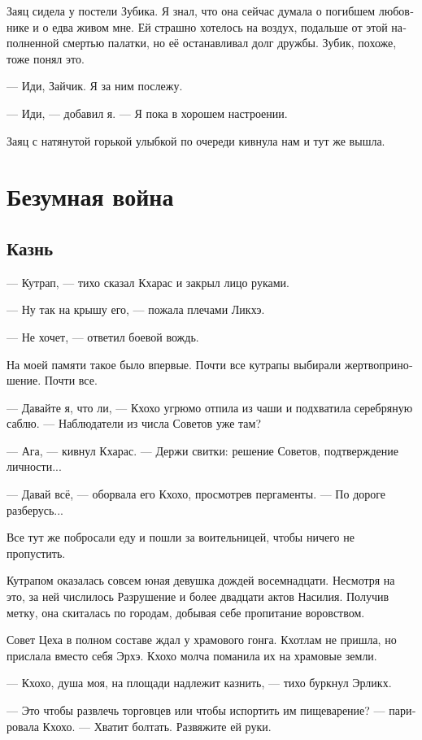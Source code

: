 \documentclass[a4paper,12pt,fleqn]{book}\usepackage{polyglossia}\setdefaultlanguage[babelshorthands=true]{russian}\setotherlanguage{english}\defaultfontfeatures{Ligatures=TeX,Mapping=tex-text}\usepackage{xcolor}\newcommand{\ml}[3]{#2}
\begin{document}
{Заяц сидела у постели Зубика.
Я знал, что она сейчас думала о погибшем любовнике и о едва живом мне.
Ей страшно хотелось на воздух, подальше от этой наполненной смертью палатки, но её останавливал долг дружбы.
Зубик, похоже, тоже понял это.

--- Иди, Зайчик.
Я за ним послежу.

--- Иди, --- добавил я.
--- Я пока в хорошем настроении.

Заяц с натянутой горькой улыбкой по очереди кивнула нам и тут же вышла.

\chapter{Безумная война}

\section{Казнь}

--- Кутрап, --- тихо сказал Кхарас и закрыл лицо руками.

--- Ну так на крышу его, --- пожала плечами Ликхэ.

--- Не хочет, --- ответил боевой вождь.

На моей памяти такое было впервые.
Почти все кутрапы выбирали жертвоприношение.
Почти все.

--- Давайте я, что ли, --- Кхохо угрюмо отпила из чаши и подхватила серебряную саблю.
--- Наблюдатели из числа Советов уже там?

--- Ага, --- кивнул Кхарас.
--- Держи свитки: решение Советов, подтверждение личности...

--- Давай всё, --- оборвала его Кхохо, просмотрев пергаменты.
--- По дороге разберусь...

Все тут же побросали еду и пошли за воительницей, чтобы ничего не пропустить.

Кутрапом оказалась совсем юная девушка дождей восемнадцати.
Несмотря на это, за ней числилось Разрушение и более двадцати актов Насилия.
Получив метку, она скиталась по городам, добывая себе пропитание воровством.

Совет Цеха в полном составе ждал у храмового гонга.
Кхотлам не пришла, но прислала вместо себя Эрхэ.
Кхохо молча поманила их на храмовые земли.

--- Кхохо, душа моя, на площади надлежит казнить, --- тихо буркнул Эрликх.

--- Это чтобы развлечь торговцев или чтобы испортить им пищеварение? --- парировала Кхохо.
--- Хватит болтать.
Развяжите ей руки.

}
\end{document}
